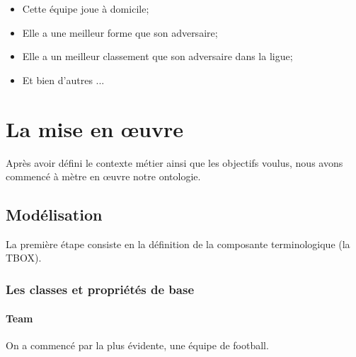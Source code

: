 \documentclass[oneside,13pt,a4paper]{article}
\begin{document}
\begin{itemize}
  \item Cette équipe joue à domicile;
  \item Elle a une meilleur forme que son adversaire;
  \item Elle a un meilleur classement que son adversaire dans la ligue;
  \item Et bien d'autres ...
\end{itemize}

\section{La mise en œuvre}

Après avoir défini le contexte métier ainsi que les objectifs voulus, nous avons commencé à mètre en œuvre notre ontologie.

\subsection{Modélisation}

La première étape consiste en la définition de la composante terminologique (la TBOX).

\subsubsection{Les classes et propriétés de base}

\paragraph{Team}

On a commencé par la plus évidente, une équipe de football.
\end{document}
